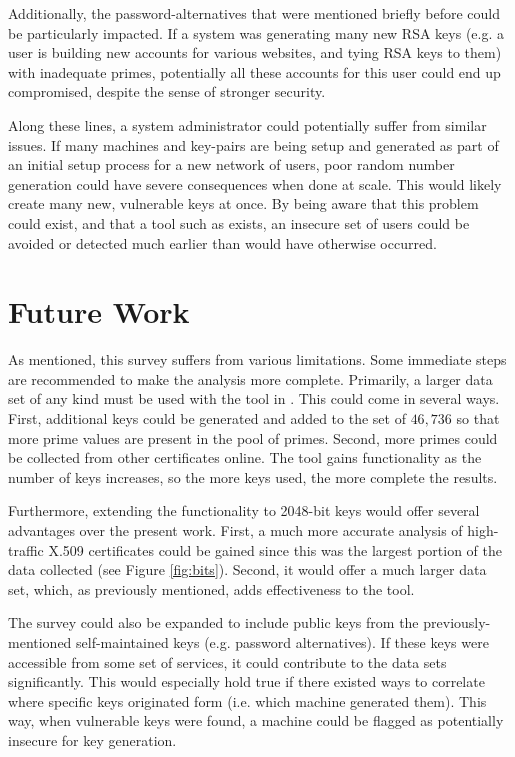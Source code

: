\documentclass{acm_proc_article-sp}
\begin{document}
Additionally, the password-alternatives that were mentioned briefly before
could be particularly impacted. If a system was generating many new RSA keys
(e.g. a user is building new accounts for various websites, and tying RSA keys
to them) with inadequate primes, potentially all these accounts for this user
could end up compromised, despite the sense of stronger security.

Along these lines, a system administrator could potentially suffer from similar
issues. If many machines and key-pairs are being setup and generated as part of
an initial setup process for a new network of users, poor random number
generation could have severe consequences when done at scale. This would likely
create many new, vulnerable keys at once. By being aware that this problem
could exist, and that a tool such as \cite{scharfglass2012breaking} exists, an
insecure set of users could be avoided or detected much earlier than would have
otherwise occurred.

\section{Future Work}
As mentioned, this survey suffers from various limitations. Some immediate
steps are recommended to make the analysis more complete. Primarily, a larger
data set of any kind must be used with the tool in
\cite{scharfglass2012breaking}. This could come in several ways. First,
additional keys could be generated and added to the set of $46,736$ so that more
prime values are present in the pool of primes. Second, more primes could be
collected from other certificates online. The tool gains functionality as the
number of keys increases, so the more keys used, the more complete the results.

Furthermore, extending the functionality to 2048-bit keys would offer several
advantages over the present work. First, a much more accurate analysis of
high-traffic X.509 certificates could be gained since this was the largest
portion of the data collected (see Figure \ref{fig:bits}). Second, it would
offer a much larger data set, which, as previously mentioned, adds
effectiveness to the tool.

The survey could also be expanded to include public keys from the 
previously-mentioned self-maintained keys (e.g. password alternatives). If
these keys were accessible from some set of services, it could contribute to
the data sets significantly. This would especially hold true if there existed
ways to correlate where specific keys originated form (i.e. which machine
generated them). This way, when vulnerable keys were found, a machine could be
flagged as potentially insecure for key generation.
\end{document}
